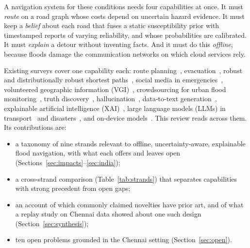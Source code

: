 \documentclass[journal]{IEEEtran}
\begin{document}
A navigation system for these conditions needs four capabilities at once. It must \emph{route} on a road graph whose costs depend on uncertain hazard evidence. It must keep a \emph{belief} about each road that fuses a static susceptibility prior with timestamped reports of varying reliability, and whose probabilities are calibrated. It must \emph{explain} a detour without inventing facts. And it must do this \emph{offline}, because floods damage the communication networks on which cloud services rely.

Existing surveys cover one capability each: route planning~\cite{bast2016route}, evacuation~\cite{bayram2016evac,li2025overview}, robust and distributionally robust shortest paths~\cite{filippi2025survey}, social media in emergencies~\cite{imran2015social}, volunteered geographic information (VGI)~\cite{senaratne2017vgi}, crowdsourcing for urban flood monitoring~\cite{helmrich2021opportunities}, truth discovery~\cite{li2016truthsurvey}, hallucination~\cite{ji2023hallucination}, data-to-text generation~\cite{osuji2024d2t}, explainable artificial intelligence (XAI)~\cite{adadi2018xai,guidotti2018survey,gilpin2018explaining}, large language models (LLMs) in transport~\cite{wandelt2024its,nie2025llm4tr,yan2025llmtransport,zhang2024mobilityllm} and disasters~\cite{lei2025disaster,xu2025disasterreview,zhu2025urbandisaster}, and on-device models~\cite{xu2024ondevice,lu2024slmsurvey}. This review reads across them. Its contributions are:
\begin{itemize}
\item a taxonomy of nine strands relevant to offline, uncertainty-aware, explainable flood navigation, with what each offers and leaves open (Sections~\ref{sec:impacts}--\ref{sec:india});
\item a cross-strand comparison (Table~\ref{tab:strands}) that separates capabilities with strong precedent from open gaps;
\item an account of which commonly claimed novelties have prior art, and of what a replay study on Chennai data showed about one such design (Section~\ref{sec:synthesis});
\item ten open problems grounded in the Chennai setting (Section~\ref{sec:open}).
\end{itemize}
\end{document}

